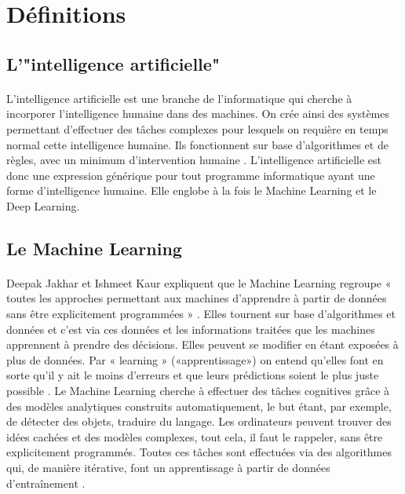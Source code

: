 \documentclass{article}
\begin{document}
\section{Définitions}
\subsection{L'"intelligence artificielle"}
\paragraph{}
L’intelligence artificielle est une branche de l’informatique qui cherche à incorporer l’intelligence humaine dans des machines. On crée ainsi des systèmes permettant d’effectuer des tâches complexes pour lesquels on requière en temps normal cette intelligence humaine. Ils fonctionnent sur base d’algorithmes et de règles, avec un minimum d’intervention humaine \cite{janiesch2021machine, jakhar2020artificial}. L’intelligence artificielle est donc une expression générique pour tout programme informatique ayant une forme d’intelligence humaine. Elle englobe à la fois le Machine Learning et le Deep Learning\cite{jakhar2020artificial}. 
\subsection{Le Machine Learning}
\paragraph{}
Deepak Jakhar et Ishmeet Kaur expliquent que le Machine Learning regroupe « toutes les approches permettant aux machines d’apprendre à partir de données sans être explicitement programmées » \cite{jakhar2020artificial}. Elles tournent sur base d’algorithmes et données et c’est via ces données et les informations traitées que les machines apprennent à prendre des décisions. Elles peuvent se modifier en étant exposées à plus de données. Par « learning » («apprentissage») on entend qu’elles font en sorte qu’il y ait le moins d’erreurs et que leurs prédictions soient le plus juste possible \cite{jakhar2020artificial}. Le Machine Learning cherche à effectuer des tâches cognitives grâce à des modèles analytiques construits automatiquement, le but étant, par exemple, de détecter des objets, traduire du langage. Les ordinateurs peuvent trouver des idées cachées et des modèles complexes, tout cela, il faut le rappeler, sans être explicitement programmés. Toutes ces tâches sont effectuées via des algorithmes qui, de manière itérative, font un apprentissage à partir de données d’entraînement \cite{janiesch2021machine}. 
\end{document}
